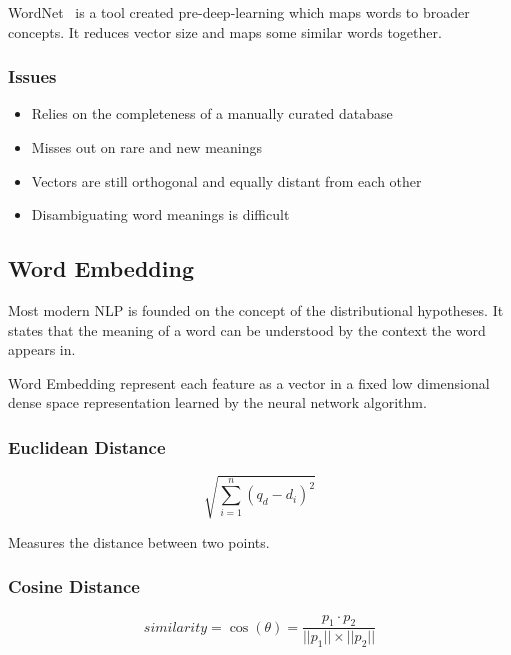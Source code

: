 \documentclass[11pt]{article}
\begin{document}
WordNet~\cite{wordnet-how-to} is a tool created pre-deep-learning which maps words to broader concepts. It reduces vector size and maps some similar words together.

\subsubsection{Issues}

\begin{itemize}
    \item Relies on the completeness of a manually curated database
    \item Misses out on rare and new meanings
    \item Vectors are still orthogonal and equally distant from each other
    \item Disambiguating word meanings is difficult
\end{itemize}

\subsection{Word Embedding}

Most modern NLP is founded on the concept of the distributional hypotheses. It states that the meaning of a word can be understood by the context the word appears in. 

Word Embedding represent each feature as a vector in a fixed low dimensional dense space representation learned by the neural network algorithm.

\subsubsection{Euclidean Distance}

\begin{definition}
    \begin{equation*}
        \sqrt{\sum^n_{i=1}(q_d - d_i)^2}
    \end{equation*}    
\end{definition}

Measures the distance between two points.

\subsubsection{Cosine Distance}

\begin{definition}
    \begin{equation*}
        similarity = \cos(\theta) = \frac{p_1 \cdot p_2}{||p_1|| \times ||p_2||}    
    \end{equation*}
\end{definition}
\end{document}
